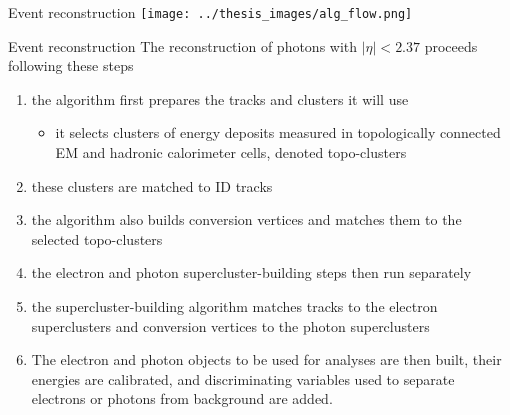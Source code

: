 \documentclass[10pt,UKenglish, leqno, xcolor = dvipsnames]{beamer}
\begin{document}
		\begin{frame}{Event reconstruction}
			\vfill
			\centering
			\texttt{[image: ../thesis\_images/alg\_flow.png]}	
			\vfill
		\end{frame}
	
		\begin{frame}{Event reconstruction}
			\vfill	
			The reconstruction of photons with $|\eta| < 2.37$ proceeds following these steps
			\begin{enumerate}
				\item the algorithm first prepares the tracks and clusters it will use
				\begin{itemize}
					\item it selects clusters of energy deposits measured in topologically connected EM and hadronic calorimeter cells, denoted topo-clusters
				\end{itemize}
				\item these clusters are matched to ID tracks
				\item the algorithm also builds conversion vertices and matches them to the selected topo-clusters
				\item the electron and photon supercluster-building steps then run separately
				\item the supercluster-building algorithm matches tracks to the electron superclusters and conversion vertices to the photon superclusters
				\item The electron and photon objects to be used for analyses are then built, their energies are calibrated, and discriminating variables used to separate electrons or photons from background are added.
			\end{enumerate}
			\vfill
		\end{frame}
	
\end{document}
